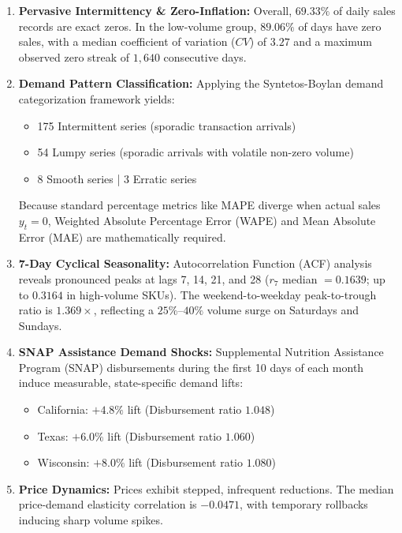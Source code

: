 \documentclass[conference]{IEEEtran}
\begin{document}
\begin{enumerate}
    \item \textbf{Pervasive Intermittency \& Zero-Inflation:} 
    Overall, $69.33\%$ of daily sales records are exact zeros. In the low-volume group, $89.06\%$ of days have zero sales, with a median coefficient of variation ($CV$) of $3.27$ and a maximum observed zero streak of $1,640$ consecutive days.
    \item \textbf{Demand Pattern Classification:} Applying the Syntetos-Boylan demand categorization framework yields:
    \begin{itemize}
        \item 175 Intermittent series (sporadic transaction arrivals)
        \item 54 Lumpy series (sporadic arrivals with volatile non-zero volume)
        \item 8 Smooth series | 3 Erratic series
    \end{itemize}
    Because standard percentage metrics like MAPE diverge when actual sales $y_t = 0$, Weighted Absolute Percentage Error (WAPE) and Mean Absolute Error (MAE) are mathematically required.
    \item \textbf{7-Day Cyclical Seasonality:} Autocorrelation Function (ACF) analysis reveals pronounced peaks at lags 7, 14, 21, and 28 ($r_7$ median $= 0.1639$; up to $0.3164$ in high-volume SKUs). The weekend-to-weekday peak-to-trough ratio is $1.369\times$, reflecting a $25\%\text{--}40\%$ volume surge on Saturdays and Sundays.
    \item \textbf{SNAP Assistance Demand Shocks:} Supplemental Nutrition Assistance Program (SNAP) disbursements during the first 10 days of each month induce measurable, state-specific demand lifts:
    \begin{itemize}
        \item California: $+4.8\%$ lift (Disbursement ratio $1.048$)
        \item Texas: $+6.0\%$ lift (Disbursement ratio $1.060$)
        \item Wisconsin: $+8.0\%$ lift (Disbursement ratio $1.080$)
    \end{itemize}
    \item \textbf{Price Dynamics:} Prices exhibit stepped, infrequent reductions. The median price-demand elasticity correlation is $-0.0471$, with temporary rollbacks inducing sharp volume spikes.
\end{enumerate}

\end{document}
